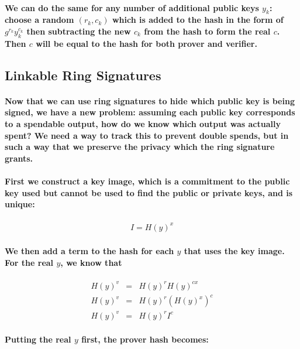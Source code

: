 \documentclass{article}
\begin{document}
\paragraph{We can do the same for any number of additional public keys $y_k$: choose a random $(r_k,c_k)$ which is added to the hash in the form of $g^{r_k}y_k^{c_k}$ then subtracting the new $c_k$ from the hash to form the real $c$. Then $c$ will be equal to the hash for both prover and verifier.}



\subsection{Linkable Ring Signatures}

\paragraph{Now that we can use ring signatures to hide which public key is being signed, we have a new problem: assuming each public key corresponds to a spendable output, how do we know which output was actually spent?  We need a way to track this to prevent double spends, but in such a way that we preserve the privacy which the ring signature grants.}

\paragraph{First we construct a key image, which is a commitment to the public key used but cannot be used to find the public or private keys, and is unique:}

\begin{eqnarray}
  I = H(y)^x
\end{eqnarray}

\paragraph{We then add a term to the hash for each $y$ that uses the key image.  For the real $y$, we know that}

\begin{eqnarray}
  H(y)^v &=& H(y)^r H(y)^{cx}\\
  H(y)^v &=& H(y)^r (H(y)^x)^c\\
  H(y)^v &=& H(y)^r I^c
\end{eqnarray}

\paragraph{Putting the real $y$ first, the prover hash becomes:}
\end{document}

